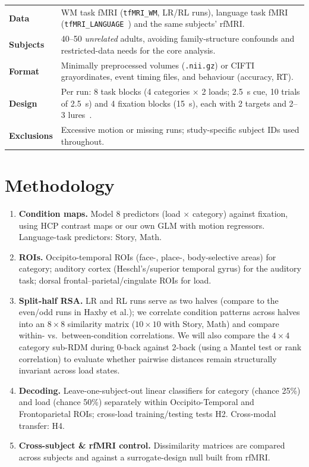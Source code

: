 \documentclass[10pt,a4paper]{article}
\begin{document}
\vspace{1pt}
\begingroup\footnotesize
\setlength{\extrarowheight}{4pt}
\begin{tabularx}{\linewidth}{@{}>{\bfseries\sffamily\color{accent}}l Y@{}}
  Data & WM task fMRI (\texttt{tfMRI\_WM}, LR/RL runs), language task fMRI (\texttt{tfMRI\_LANGUAGE}~\cite{binder2011}) and the same subjects' rfMRI.\\
  Subjects & 40--50 \emph{unrelated} adults, avoiding family-structure confounds and restricted-data needs for the core analysis.\\
  Format & Minimally preprocessed volumes (\texttt{.nii.gz}) or CIFTI grayordinates, event timing files, and behaviour (accuracy, RT).\\
  Design & Per run: 8 task blocks (4 categories $\times$ 2 loads; 2.5~s cue, 10 trials of 2.5~s) and 4 fixation blocks (15~s), each with 2 targets and 2--3 lures~\cite{barch2013}.\\
  Exclusions & Excessive motion or missing runs; study-specific subject IDs used throughout.\\
\end{tabularx}
\endgroup


\section{Methodology}
\begin{enumerate}
  \item \textbf{Condition maps.} Model 8 predictors (load $\times$ category) against fixation, using HCP contrast maps or our own GLM with motion regressors. Language-task predictors: Story, Math.
  \item \textbf{ROIs.} Occipito-temporal ROIs (face-, place-, body-selective areas) for category; auditory cortex (Heschl's/superior temporal gyrus) for the auditory task; dorsal frontal--parietal/cingulate ROIs for load.
  \item \textbf{Split-half RSA.} LR and RL runs serve as two halves (compare to the even/odd runs in Haxby et al.); we correlate condition patterns across halves into an $8\times8$ similarity matrix ($10\times10$ with Story, Math) and compare within- vs.\ between-condition correlations. We will also compare the $4\times4$ category sub-RDM during 0-back against 2-back (using a Mantel test or rank correlation) to evaluate whether pairwise distances remain structurally invariant across load states.
  \item \textbf{Decoding.} Leave-one-subject-out linear classifiers for category (chance 25\%) and load (chance 50\%) separately within Occipito-Temporal and Frontoparietal ROIs; cross-load training/testing tests H2. Cross-modal transfer: H4.
  \item \textbf{Cross-subject \& rfMRI control.} Dissimilarity matrices are compared across subjects and against a surrogate-design null built from rfMRI.
\end{enumerate}
\end{document}
